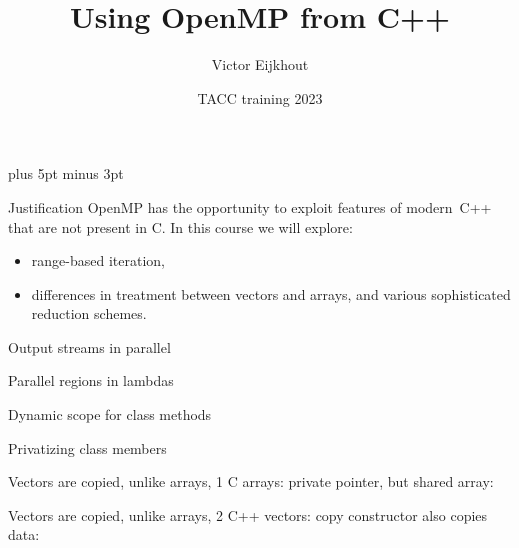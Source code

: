 \documentclass[11pt,headernav]{beamer}
\begin{document}
\parskip=10pt plus 5pt minus 3pt

\title{Using OpenMP from C++}
\author{Victor Eijkhout}
\date{TACC training 2023}

\begin{frame}
  \titlepage
\end{frame}

\begin{frame}{Justification}
  OpenMP has the opportunity to exploit features of modern~C++
  that are not present in C.
  In this course we will explore:
  \begin{itemize}
  \item
    range-based iteration,
  \item
    differences in treatment between vectors and arrays,
    and various sophisticated reduction schemes.
  \end{itemize}

\end{frame}


\begin{numberedframe}{Output streams in parallel}
  
\end{numberedframe}

\begin{numberedframe}{Parallel regions in lambdas}
  
\end{numberedframe}

\begin{numberedframe}{Dynamic scope for class methods}
  \def\snippetoutputsize{\footnotesize}
  
\end{numberedframe}

\begin{numberedframe}{Privatizing class members}
  
\end{numberedframe}

\begin{numberedframe}{Vectors are copied, unlike arrays, 1}
  C arrays: private pointer, but shared array:
\end{numberedframe}

\begin{numberedframe}{Vectors are copied, unlike arrays, 2}
  C++ vectors: copy constructor also copies data:
\end{numberedframe}
\end{document}
